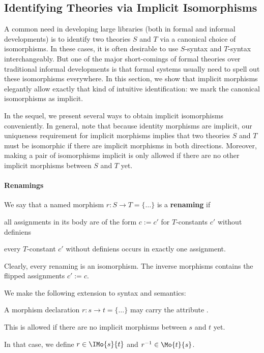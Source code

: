 \subsection{Identifying Theories via Implicit Isomorphisms}\label{sec:inverse}

A common need in developing large libraries (both in formal and informal developments) is to identify two theories $S$ and $T$ via a canonical choice of isomorphisms.
In these cases, it is often desirable to use $S$-syntax and $T$-syntax interchangeably.
But one of the major short-comings of formal theories over traditional informal developments is that formal systems usually need to spell out these isomorphisms everywhere.
In this section, we show that implicit morphisms elegantly allow exactly that kind of intuitive identification: we mark the canonical isomorphisms as implicit.

In the sequel, we present several ways to obtain implicit isomorphisms conveniently.
In general, note that because identity morphisms are implicit, our uniqueness requirement for implicit morphisms implies that two theories $S$ and $T$ must be isomorphic if there are implicit morphisms in both directions.
Moreover, making a pair of isomorphisms implicit is only allowed if there are no other implicit morphisms between $S$ and $T$ yet.

\paragraph{Renamings}
We say that a named morphism $r:S\to T=\{\ldots\}$ is a \textbf{renaming} if
\begin{compactitem}
 \item all assignments in its body are of the form $c:=c'$ for $T$-constants $c'$ without definiens
 \item every  $T$-constant $c'$ without definiens occurs in exactly one assignment.
\end{compactitem}
Clearly, every renaming is an isomorphism.
The inverse morphisms contains the flipped assignments $c':=c$.

We make the following extension to syntax and semantics:
\begin{compactitem}
  \item A morphism declaration $r:s\to t=\{\ldots\}$ may carry the attribute .
  \item This is allowed if there are no implicit morphisms between $s$ and $t$ yet.
  \item In that case, we define $r\in\IMo{s}{t}$ and $r^{-1}\in\Mo{t}{s}$.
\end{compactitem}

